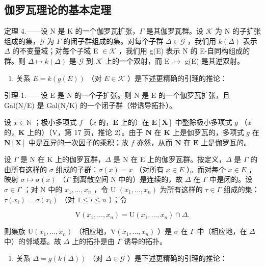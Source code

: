 \subsection{伽罗瓦理论的基本定理}

定理 4.——设 N 是 K 的一个伽罗瓦扩张，\(\Gamma\) 是其伽罗瓦群。设 \(\mathcal{K}\) 为 N 的子扩张组成的集，\(\mathcal{G}\) 为 \(\Gamma\) 的闭子群组成的集。对每个子群 \(\Delta \in \mathcal{G}\) ，我们用 \(k(\Delta)\) 表示 \(\Delta\) 的不变量域；对每个子域 E \(\in \mathcal{K}\) ，我们用 g(E) 表示 N 的 E-自同构组成的群。则 \(\Delta \mapsto k(\Delta)\) 是 \(\mathcal{G}\) 到 \(\mathcal{K}\) 上的一个双射，而 E \(\mapsto\) g(E) 是其逆双射。

\begin{enumerate}
\def\labelenumi{\Alph{enumi})}
\tightlist
\item
  关系 \(E = k(g(E))\) （对 \(E \in \mathcal{K}\) ）是下述更精确的引理的推论：
\end{enumerate}

引理 1.——设 E 是 N 的一个子扩张。则 N 是 E 的一个伽罗瓦扩张，且 Gal(N/E) 是 Gal(N/K) 的一个闭子群（带诱导拓扑）。

设 \(x \in \mathbb{N}\) ；极小多项式 \(f\) （\(x\) 的，\(\mathbf{E}\) 上的）在 \(\mathbf{E}[\mathbf{X}]\) 中整除极小多项式 \(g\) （\(x\) 的，\(\mathbf{K}\) 上的）（V，第 17 页，推论 2）。由于 \(\mathbf{N}\) 在 \(\mathbf{K}\) 上是伽罗瓦的，多项式 \(g\) 在 \(\mathbf{N}[\mathbf{X}]\) 中是互异的一次因子的乘积；故 \(f\) 亦然，从而 \(\mathbf{N}\) 在 \(\mathbf{E}\) 上是伽罗瓦的。

设 \(\Gamma\) 是 N 在 K 上的伽罗瓦群，\(\Delta\) 是 N 在 E 上的伽罗瓦群。按定义，\(\Delta\) 是 \(\Gamma\) 的由所有这样的 \(\sigma\) 组成的子群：\(\sigma(x) = x\) （对所有 \(x \in E\) ）。而对每个 \(x \in E\) ，映射 \(\sigma \mapsto \sigma(x)\) （\(\Gamma\) 到离散空间 N 中的）是连续的，故 \(\Delta\) 在 \(\Gamma\) 中是闭的。设 \(\sigma \in \Gamma\) ；对 N 中的 \(x_1, \ldots, x_n\) ，令 U \((x_1, \ldots, x_n)\) 为所有这样的 \(\tau \in \Gamma\) 组成的集：\(\tau(x_i) = \sigma(x_i)\) （对 \(1 \leqslant i \leqslant n\) ）；令

\[
\mathrm{V} \left(x _ {1}, \dots , x _ {n}\right) = \mathrm{U} \left(x _ {1}, \dots , x _ {n}\right) \cap \Delta .
\]

则集族 \(\mathrm{U}(x_{1},\ldots,x_{n})\) （相应地，\(\mathrm{V}(x_{1},\ldots,x_{n})\) ）是 \(\sigma\) 在 \(\Gamma\) 中（相应地，在 \(\Delta\) 中）的邻域基。故 \(\Delta\) 上的拓扑是由 \(\Gamma\) 诱导的拓扑。

\begin{enumerate}
\def\labelenumi{\Alph{enumi})}
\setcounter{enumi}{1}
\tightlist
\item
  关系 \(\Delta = g(k(\Delta))\) （对 \(\Delta \in \mathcal{G}\) ）是下述更精确的引理的推论：
\end{enumerate}

